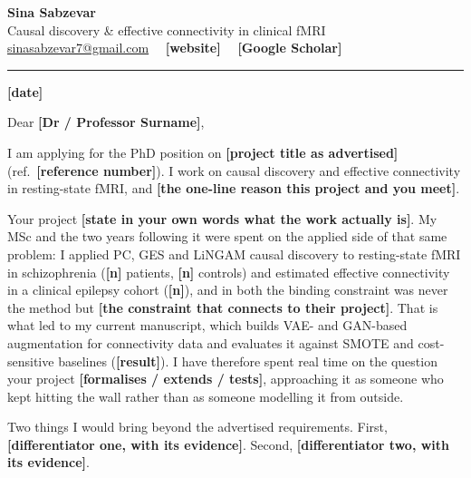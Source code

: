\documentclass[11pt,a4paper]{article}
\newif\ifdraft
\newcommand{\fillme}[1]{\ifdraft{\color{todo}\bfseries[FILL: #1]}\else\textbf{[#1]}\fi}
\begin{document}
{\LARGE\bfseries\color{accent} Sina Sabzevar}\\[2pt]
{\small\color{muted} Causal discovery \& effective connectivity in clinical fMRI}\\[5pt]
{\small
  \href{mailto:sinasabzevar7@gmail.com}{sinasabzevar7@gmail.com}
  \ \textbar\ \fillme{website}
  \ \textbar\ \fillme{Google Scholar}
}\\[-2pt]
{\color{rule}\rule{\linewidth}{0.7pt}}

\vspace{10pt}
{\small\color{muted}\fillme{date}}

\vspace{10pt}

Dear \fillme{Dr / Professor Surname},

I am applying for the PhD position on \fillme{project title as advertised}
(ref.\ \fillme{reference number}). I work on causal discovery and effective connectivity in
resting-state fMRI, and \fillme{the one-line reason this project and you meet}.

Your project \fillme{state in your own words what the work actually is}. My MSc and the two
years following it were spent on the applied side of that same problem: I applied PC, GES and
LiNGAM causal discovery to resting-state fMRI in schizophrenia (\fillme{n} patients,
\fillme{n} controls) and estimated effective connectivity in a clinical epilepsy cohort
(\fillme{n}), and in both the binding constraint was never the method but
\fillme{the constraint that connects to their project}. That is what led to my current
manuscript, which builds VAE- and GAN-based augmentation for connectivity data and evaluates it
against SMOTE and cost-sensitive baselines (\fillme{result}). I have therefore spent real time
on the question your project \fillme{formalises / extends / tests}, approaching it as someone
who kept hitting the wall rather than as someone modelling it from outside.

Two things I would bring beyond the advertised requirements. First,
\fillme{differentiator one, with its evidence}. Second,
\fillme{differentiator two, with its evidence}.
\end{document}
